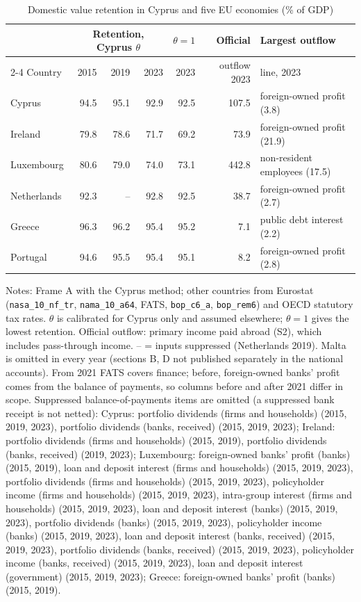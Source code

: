 \begin{table}[!htbp]
\centering
\small
\caption{Domestic value retention in Cyprus and five EU economies (\% of GDP)}
\label{tab:comparison}
\begin{tabular}{lrrrrr>{\raggedright\arraybackslash}p{}}
\toprule
 & \multicolumn{3}{c}{Retention, Cyprus $\theta$} & $\theta=1$ & Official & Largest outflow \\
\cmidrule(lr){2-4}
Country & 2015 & 2019 & 2023 & 2023 & outflow 2023 & line, 2023 \\
\midrule
Cyprus & 94.5 & 95.1 & 92.9 & 92.5 & 107.5 & foreign-owned profit (3.8) \\
Ireland & 79.8 & 78.6 & 71.7 & 69.2 & 73.9 & foreign-owned profit (21.9) \\
Luxembourg & 80.6 & 79.0 & 74.0 & 73.1 & 442.8 & non-resident employees (17.5) \\
Netherlands & 92.3 & -- & 92.8 & 92.5 & 38.7 & foreign-owned profit (2.7) \\
Greece & 96.3 & 96.2 & 95.4 & 95.2 & 7.1 & public debt interest (2.2) \\
Portugal & 94.6 & 95.5 & 95.4 & 95.1 & 8.2 & foreign-owned profit (2.8) \\
\bottomrule
\end{tabular}

\smallskip
\begin{minipage}{0.95\textwidth}\footnotesize Notes: Frame A with the Cyprus method; other countries from Eurostat (\texttt{nasa\_10\_nf\_tr}, \texttt{nama\_10\_a64}, FATS, \texttt{bop\_c6\_a}, \texttt{bop\_rem6}) and OECD statutory tax rates. $\theta$ is calibrated for Cyprus only and assumed elsewhere; $\theta=1$ gives the lowest retention. Official outflow: primary income paid abroad (S2), which includes pass-through income. -- = inputs suppressed (Netherlands 2019). Malta is omitted in every year (sections B, D not published separately in the national accounts). From 2021 FATS covers finance; before, foreign-owned banks' profit comes from the balance of payments, so columns before and after 2021 differ in scope. Suppressed balance-of-payments items are omitted (a suppressed bank receipt is not netted): Cyprus: portfolio dividends (firms and households) (2015, 2019, 2023), portfolio dividends (banks, received) (2015, 2019, 2023); Ireland: portfolio dividends (firms and households) (2015, 2019), portfolio dividends (banks, received) (2019, 2023); Luxembourg: foreign-owned banks' profit (banks) (2015, 2019), loan and deposit interest (firms and households) (2015, 2019, 2023), portfolio dividends (firms and households) (2015, 2019, 2023), policyholder income (firms and households) (2015, 2019, 2023), intra-group interest (firms and households) (2015, 2019, 2023), loan and deposit interest (banks) (2015, 2019, 2023), portfolio dividends (banks) (2015, 2019, 2023), policyholder income (banks) (2015, 2019, 2023), loan and deposit interest (banks, received) (2015, 2019, 2023), portfolio dividends (banks, received) (2015, 2019, 2023), policyholder income (banks, received) (2015, 2019, 2023), loan and deposit interest (government) (2015, 2019, 2023); Greece: foreign-owned banks' profit (banks) (2015, 2019).\end{minipage}
\end{table}
